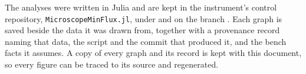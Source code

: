 \documentclass{article}
\begin{document}
\begin{appendices}
The analyses were written in Julia and are kept in the instrument's control repository,
\texttt{MicroscopeMinFlux.jl}, under  and  on the branch
. Each graph is saved beside the data it was
drawn from, together with a provenance record naming that data, the script and the commit that
produced it, and the bench facts it assumes. A copy of every graph and its record is kept with this
document, so every figure can be traced to its source and regenerated.

\end{appendices}
\end{document}
